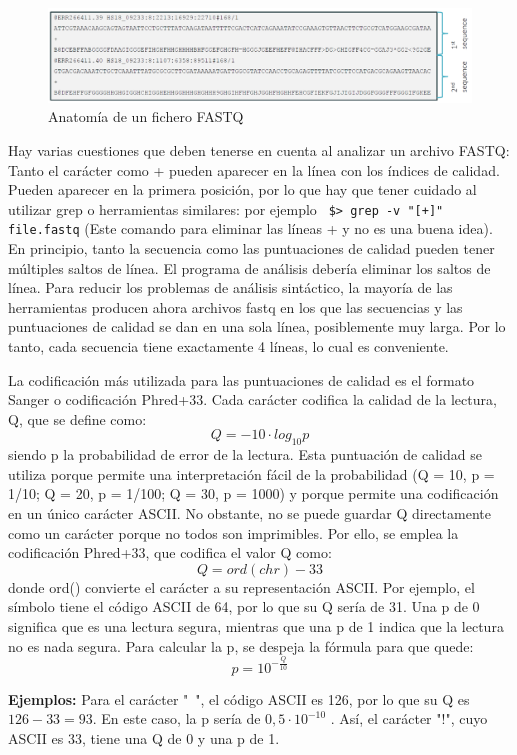 \begin{figure}[htbp]
\centering
\includegraphics[width = \textwidth]{figs/fastq.png}
\caption{Anatomía de un fichero FASTQ}
\label{fig:fastq}
\end{figure}

Hay varias cuestiones que deben tenerse en cuenta al analizar un archivo FASTQ: Tanto el carácter \@ como + pueden aparecer en la línea con los índices de calidad. Pueden aparecer en la primera posición, por lo que hay que tener cuidado al utilizar grep o herramientas similares: por ejemplo \texttt{ \$> grep -v "[\@ +]" file.fastq} (Este comando para eliminar las líneas + y \@ no es una buena idea). En principio, tanto la secuencia como las puntuaciones de calidad pueden tener múltiples saltos de línea. El programa de análisis debería eliminar los saltos de línea. Para reducir los problemas de análisis sintáctico, la mayoría de las herramientas producen ahora archivos fastq en los que las secuencias y las puntuaciones de calidad se dan en una sola línea, posiblemente muy larga. Por lo tanto, cada secuencia tiene exactamente 4 líneas, lo cual es conveniente.

La codificación más utilizada para las puntuaciones de calidad es el formato Sanger o codificación Phred+33. Cada carácter codifica la calidad de la lectura, Q, que se define como:
$$Q = -10 \cdot log_{10} p$$
siendo p la probabilidad de error de la lectura. Esta puntuación de calidad se utiliza porque permite una interpretación fácil de la probabilidad (Q = 10, p = 1/10; Q = 20, p = 1/100; Q = 30, p = 1000) y porque permite una codificación en un único carácter ASCII. No obstante, no se puede guardar Q directamente como un carácter porque no todos son imprimibles. Por ello, se emplea la codificación Phred+33, que codifica el valor Q como:
$$Q = ord(chr) - 33$$
donde ord() convierte el carácter a su representación ASCII. Por ejemplo, el símbolo \@ tiene el código ASCII de 64, por lo que su Q sería de 31. Una p de 0 significa que es una lectura segura, mientras que una p de 1 indica que la lectura no es nada segura. Para calcular la p, se despeja la fórmula para que quede:
$$ p = 10^{-\frac{Q}{10}}$$

\textbf{Ejemplos:}
Para el carácter "~", el código ASCII es 126, por lo que su Q es $126-33 = 93$. En este caso, la p sería de $0,5 \cdot 10^{-10}$ .  Así, el carácter "!", cuyo ASCII es 33, tiene una Q de 0 y una p de 1. 

